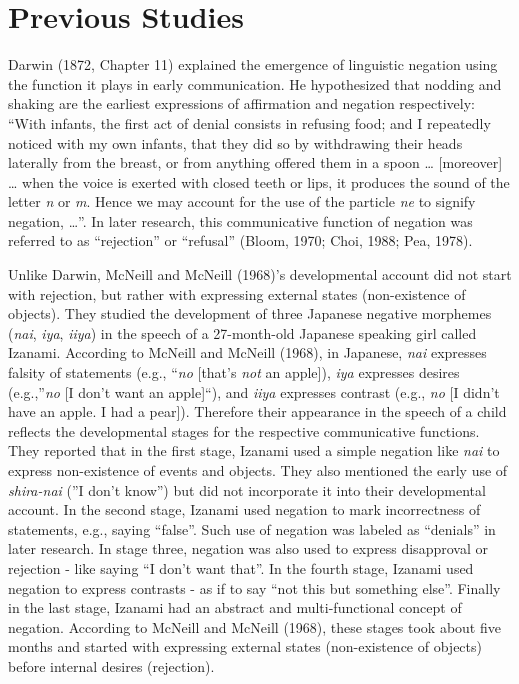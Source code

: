 \documentclass[
  man,floatsintext]{apa6}
\begin{document}
\hypertarget{previous-studies}{%
\section{Previous Studies}\label{previous-studies}}

Darwin (1872, Chapter 11) explained the emergence of linguistic negation using the function it plays in early communication. He hypothesized that nodding and shaking are the earliest expressions of affirmation and negation respectively: ``With infants, the first act of denial consists in refusing food; and I repeatedly noticed with my own infants, that they did so by withdrawing their heads laterally from the breast, or from anything offered them in a spoon \ldots{} {[}moreover{]} \ldots{} when the voice is exerted with closed teeth or lips, it produces the sound of the letter \emph{n} or \emph{m}. Hence we may account for the use of the particle \emph{ne} to signify negation, \ldots{}''. In later research, this communicative function of negation was referred to as ``rejection'' or ``refusal'' (Bloom, 1970; Choi, 1988; Pea, 1978).

Unlike Darwin, McNeill and McNeill (1968)'s developmental account did not start with rejection, but rather with expressing external states (non-existence of objects). They studied the development of three Japanese negative morphemes (\emph{nai}, \emph{iya}, \emph{iiya}) in the speech of a 27-month-old Japanese speaking girl called Izanami. According to McNeill and McNeill (1968), in Japanese, \emph{nai} expresses falsity of statements (e.g., ``\emph{no} {[}that's \emph{not} an apple{]}), \emph{iya} expresses desires (e.g.,''\emph{no} {[}I don't want an apple{]}``), and \emph{iiya} expresses contrast (e.g., \emph{no} {[}I didn't have an apple. I had a pear{]}). Therefore their appearance in the speech of a child reflects the developmental stages for the respective communicative functions. They reported that in the first stage, Izanami used a simple negation like \emph{nai} to express non-existence of events and objects. They also mentioned the early use of \emph{shira-nai} (''I don't know'') but did not incorporate it into their developmental account. In the second stage, Izanami used negation to mark incorrectness of statements, e.g., saying ``false''. Such use of negation was labeled as ``denials'' in later research. In stage three, negation was also used to express disapproval or rejection - like saying ``I don't want that''. In the fourth stage, Izanami used negation to express contrasts - as if to say ``not this but something else''. Finally in the last stage, Izanami had an abstract and multi-functional concept of negation. According to McNeill and McNeill (1968), these stages took about five months and started with expressing external states (non-existence of objects) before internal desires (rejection).
\end{document}

